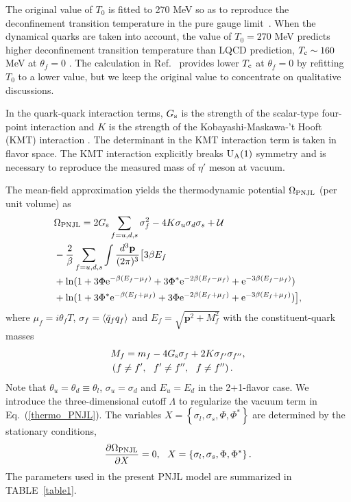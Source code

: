 \documentclass[prd,superscriptaddress,unsortedaddress,
twocolumn,showpacs,preprintnumbers,amsmath,amssymb]{revtex4}
\begin{document}
The original value of $T_{0}$ is fitted to 270 MeV
so as to reproduce the deconfinement transition temperature
in the pure gauge limit~\cite{Boyd, Kaczmarek}.
When the dynamical quarks are taken into account,
the value of $T_{0}=270$ MeV predicts higher deconfinement transition temperature
than LQCD prediction, $T_{\rm c}\sim 160$ MeV at $\theta_{f}=0$
\cite{Fodor_Katz_tem,Borsanyi, Soldner, Kanaya, Laermann}.
The calculation in Ref.~\cite{Sasaki_EPNJL}
provides lower $T_{\rm c}$ at $\theta_{f}=0$ by refitting $T_{0}$ to a lower value,
but we keep the original value to concentrate on qualitative discussions.

In the quark-quark interaction terms, $G_{\rm s}$ is the strength of the
scalar-type four-point interaction
and $K$ is the strength of the Kobayashi-Maskawa-'t Hooft (KMT) interaction
\cite{tHooft, Kobayashi-Maskawa, Kobayashi-Kondo-Maskawa}.
The determinant in the KMT interaction term is taken in flavor space.
The KMT interaction explicitly breaks $\textrm{U}_{\rm A}(1)$ symmetry
and is necessary to reproduce the measured mass of $\eta'$ meson
at vacuum.

The mean-field approximation yields the
thermodynamic potential $\Omega_{\rm PNJL}$
(per unit volume) as 
   \begin{align}
   &\Omega_{\rm PNJL}=
   2G_{\rm s}\sum_{f=u,d,s}\sigma^2_{f}
   -4K\sigma_{u}\sigma_{d}\sigma_{s}
   +\mathcal{U}
   \notag \\
   &-\frac{2}{\beta}\sum_{f=u,d,s}\int\frac{d^3\mathbf{p}}{(2\pi)^3}
   \bigl[
   3\beta E_{f}
   \notag \\
   &+
   \ln(1+3\Phi\textrm{e}^{-\beta(E_{f}-\mu_{f})}
   +3\Phi^{\ast}\textrm{e}^{-2\beta(E_{f}-\mu_{f})}
   +\textrm{e}^{-3\beta(E_{f}-\mu_{f})})
   \notag \\
   &+
   \ln(1+3\Phi^{\ast}\textrm{e}^{-\beta(E_{f}+\mu_{f})}
   +3\Phi\textrm{e}^{-2\beta(E_{f}+\mu_{f})}
   +\textrm{e}^{-3\beta(E_{f}+\mu_{f})})
   \bigr],
   \label{thermo_PNJL}
   \end{align}
 where $\mu_{f}=i\theta_{f}T$,
 $\sigma_{f}=\braket{\bar{q}_{f}q_{f}}$
 and $E_{f}=\sqrt{\mathbf{p}^2+M^2_{f}}$
 with the constituent-quark masses
  \begin{align}
   \begin{aligned}
  & M_{f}=m_{f}-4G_{\rm s}\sigma_{f}+2K\sigma_{f'}\sigma_{f''},
  \\
  & \left(f\ne f',\ \ f'\ne f'',\ \ f\ne f''\right).
   \end{aligned}
  \end{align}
 Note that
 $\theta_{u}=\theta_{d}\equiv \theta_{l}$,
 $\sigma_{u}=\sigma_{d}$
 and $E_{u}=E_{d}$ in the 2+1-flavor case.
 We introduce the three-dimensional cutoff $\Lambda$
 to regularize the vacuum term in Eq.~(\ref{thermo_PNJL}).
 The variables $X=\left\{\sigma_{l}, \sigma_{s},\Phi, \Phi^{\ast}\right\}$
 are determined by the stationary conditions,
 \begin{eqnarray}
  \frac{\partial \Omega_{\rm PNJL}}{\partial X}=0,\ \
   X=\left\{\sigma_{l}, \sigma_{s},\Phi, \Phi^{\ast}\right\}.
 \end{eqnarray}
 The parameters used in the present PNJL model
 are summarized in TABLE~\ref{table1}.
\end{document}
